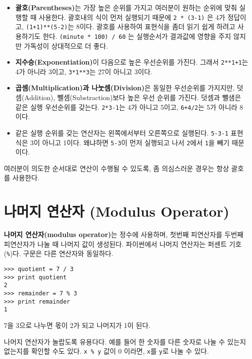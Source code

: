 \begin{itemize}

\item {\bf 괄호(Parentheses)}는 가장 높은 순위를 가지고 여러분이 원하는 순위에 맞춰 실행할 때 사용한다. 
괄호내의 식이 먼저 실행되기 때문에 {\tt 2 * (3-1)} 은 4가 정답이고, {\tt (1+1)**(5-2)}는 8이다. 
괄호를 사용하여 표현식을 좀더 읽기 쉽게 하려고 사용하기도 한다. 
{\tt (minute * 100) / 60} 는 실행순서가 결과값에 영향을 주지 않지만 가독성이 상대적으로 더 좋다.

\item {\bf 지수승(Exponentiation)}이 다음으로 높은 우선순위를 가진다. 
그래서 {\tt 2**1+1}는 4가 아니라 3이고, {\tt 3*1**3}는 27이 아니고 3이다. 

\item {\bf 곱셈(Multiplication)과 나눗셈(Division)}은 동일한 우선순위를 가지지만, 덧셈(Addition), 뺄셈(Substraction)보다 높은 우선 순위를 가진다. 덧셈과 뺄샘은 같은 실행 우선순위를 갖는다. {\tt 2*3-1}는 4가 아니고 5이고, {\tt 6+4/2}는 5가 아니라 8이다.

\item 같은 실행 순위를 갖는 연산자는 왼쪽에서부터 오른쪽으로 실행된다. 
{\tt 5-3-1} 표현식은 3이 아니고 1이다. 왜냐하면 {\tt 5-3}이 먼저 실행되고 나서 {\tt 2}에서 {\tt 1}을 빼기 때문이다.

\end{itemize}

여러분이 의도한 순서대로 연산이 수행될 수 있도록, 좀 의심스러운 경우는 항상 괄호를 사용한다.

\section{나머지 연산자 (Modulus Operator)}


{\bf 나머지 연산자(modulus operator)}는 정수에 사용하며, 첫번째 피연산자를 두번째 피연산자가 나눌 때 나머지 값이 생성된다. 
파이썬에서 나머지 연산자는 퍼센트 기호(\verb"%")다. 구문은 다른 연산자와 동일하다.

\beforeverb
\begin{verbatim}
>>> quotient = 7 / 3
>>> print quotient
2
>>> remainder = 7 % 3
>>> print remainder
1
\end{verbatim}
\afterverb
%

7을 3으로 나누면 몫이 2가 되고 나머지가 1이 된다.

나머지 연산자가 놀랍도록 유용다다. 예를 들어 한 숫자를 다른 숫자로 나눌 수 있는지 없는지를 확인할 수도 있다. 
{\tt x \% y} 값이 0 이라면, {\tt x}를 {\tt y}로 나눌 수 있다.

